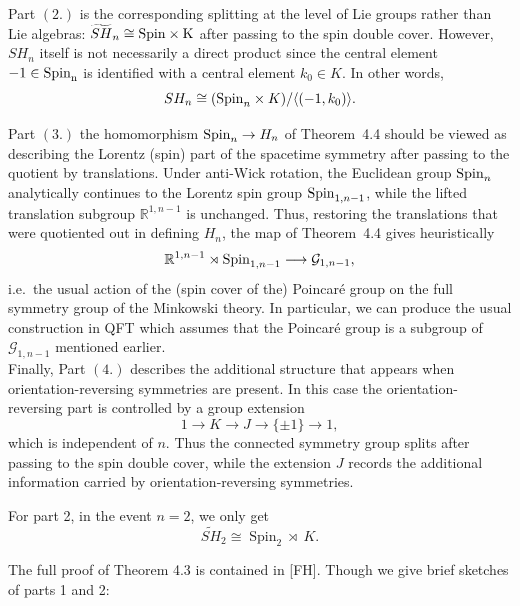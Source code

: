 \documentclass[a4paper,11pt]{article}
\begin{document}
Part $(2.)$ is the corresponding splitting at the level of Lie groups rather than Lie algebras: $\widetilde{SH}_n \cong \rm{Spin} \times K$ after passing to the spin double cover. However, $SH_n$ itself is not necessarily a direct product since the central element $-1 \in \rm{Spin}_n$ is identified with a central element $k_0 \in K$. In other words,
\[
SH_n \cong ({\rm Spin}_n \times K)/\langle(-1,k_0)\rangle.
\]

Part $(3.)$ the homomorphism ${\rm Spin}_n\to H_n$ of Theorem~4.4 should be viewed as describing the
Lorentz (spin) part of the spacetime symmetry after passing to the quotient by translations.  Under anti-Wick rotation, the Euclidean group ${\rm Spin}_n$ analytically continues to the Lorentz spin group ${\rm Spin}_{1,n-1}$, while the lifted translation subgroup $\mathbb R^{1,n-1}$ is unchanged. Thus, restoring the translations that
were quotiented out in defining $H_n$, the map of Theorem~4.4 gives heuristically
\[
  \mathbb R^{1,n-1}\rtimes{\rm Spin}_{1,n-1}
  \longrightarrow \mathcal{G}_{1,n-1},
\]
i.e.\ the usual action of the (spin cover of the) Poincaré group on the full symmetry group of the Minkowski theory.  In particular, we can produce the usual construction in QFT which assumes that the Poincar\'e group is a subgroup of $\mathcal{G}_{1,n-1}$ mentioned earlier.\\

Finally, Part $(4.)$ describes the additional structure that appears when orientation-reversing symmetries are present. In this case the orientation-reversing part is controlled by a group extension
\[
1\longrightarrow K\longrightarrow J\longrightarrow\{\pm1\}
\longrightarrow1,
\]
which is independent of $n$. Thus the connected symmetry group splits after passing to the spin double cover, while the extension $J$ records
the additional information carried by orientation-reversing symmetries.\\

\begin{remark}
    For part 2, in the event $n = 2$, we only get 
    \[
        \widetilde{SH}_2 \cong \operatorname{Spin}_2 \rtimes \; K.
    \]
\end{remark}

The full proof of Theorem 4.3 is contained in [FH]. Though we give brief sketches of parts 1 and 2:
\end{document}
